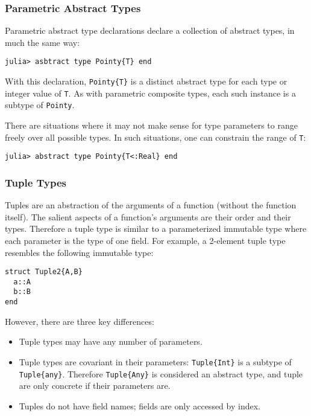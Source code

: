 \documentclass[
]{article}
\providecommand{\tightlist}{%
  \setlength{\itemsep}{0pt}\setlength{\parskip}{0pt}}
\begin{document}
\hypertarget{parametric-abstract-types}{%
\subsubsection{Parametric Abstract
Types}\label{parametric-abstract-types}}

Parametric abstract type declarations declare a collection of abstract
types, in much the same way:

\begin{verbatim}
julia> asbtract type Pointy{T} end
\end{verbatim}

With this declaration, \texttt{Pointy\{T\}} is a distinct abstract type
for each type or integer value of \texttt{T}. As with parametric
composite types, each such instance is a subtype of \texttt{Pointy}.

There are situations where it may not make sense for type parameters to
range freely over all possible types. In such situations, one can
constrain the range of \texttt{T}:

\begin{verbatim}
julia> abstract type Pointy{T<:Real} end
\end{verbatim}

\hypertarget{tuple-types}{%
\subsubsection{Tuple Types}\label{tuple-types}}

Tuples are an abstraction of the arguments of a function (without the
function itself). The salient aspects of a function's arguments are
their order and their types. Therefore a tuple type is similar to a
parameterized immutable type where each parameter is the type of one
field. For example, a 2-element tuple type resembles the following
immutable type:

\begin{verbatim}
struct Tuple2{A,B}
  a::A
  b::B
end
\end{verbatim}

However, there are three key differences:

\begin{itemize}
\tightlist
\item
  Tuple types may have any number of parameters.
\item
  Tuple types are covariant in their parameters: \texttt{Tuple\{Int\}}
  is a subtype of \texttt{Tuple\{any\}}. Therefore \texttt{Tuple\{Any\}}
  is considered an abstract type, and tuple are only concrete if their
  parameters are.
\item
  Tuples do not have field names; fields are only accessed by index.
\end{itemize}
\end{document}

